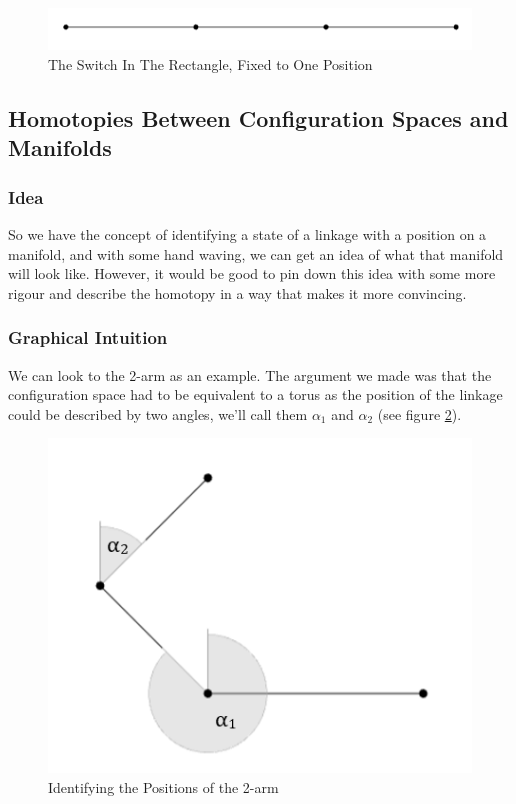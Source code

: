 \documentclass{article}
\begin{document}
\begin{figure}[h!]
\centering
\includegraphics[scale=0.4]{./images/rectangle_flat.png}
\caption{The Switch In The Rectangle, Fixed to One Position}
\label{fig:Rectangle Flat}
\end{figure}

\subsection{Homotopies Between Configuration Spaces and Manifolds}

\subsubsection{Idea}

So we have the concept of identifying a state of a linkage with a position on a manifold, and with some hand waving, we can get an idea of what that manifold will look like. However, it would be good to pin down this idea with some more rigour and describe the homotopy in a way that makes it more convincing.

\subsubsection{Graphical Intuition}

We can look to the 2-arm as an example. The argument we made was that the configuration space had to be equivalent to a torus as the position of the linkage could be described by two angles, we'll call them $\alpha_1$ and $\alpha_2$ (see figure \ref{fig:2-arm Labeled Angles}).

\begin{figure}[h!]
\centering
\includegraphics[scale=0.4]{./images/2_arm_labeled_angles.png}
\caption{Identifying the Positions of the 2-arm}
\label{fig:2-arm Labeled Angles}
\end{figure}
\end{document}
